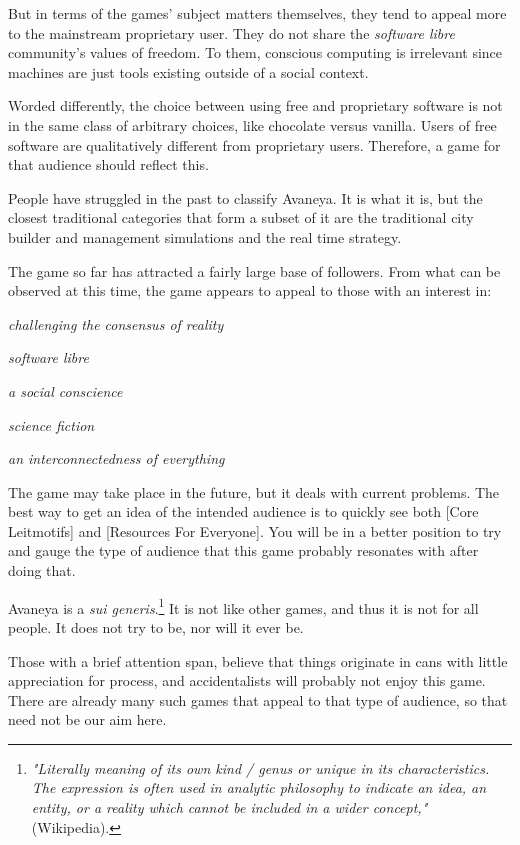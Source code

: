 But in terms of the games' subject matters themselves, they tend to appeal more to the mainstream proprietary user. They do not share the {\it software libre} community's values of freedom. To them, conscious computing is irrelevant since machines are just tools existing outside of a social context. 

Worded differently, the choice between using free and proprietary software is not in the same class of arbitrary choices, like chocolate versus vanilla. Users of free software are qualitatively different from proprietary users. Therefore, a game for that audience should reflect this.

People have struggled in the past to classify Avaneya. It is what it is, but the closest traditional categories that form a subset of it are the traditional city builder and management simulations and the real time strategy.

The game so far has attracted a fairly large base of followers. From what can be observed at this time, the game appears to appeal to those with an interest in:

\startitemize[3]
\item
{\it challenging the consensus of reality}
\item
{\it software libre}
\item
{\it a social conscience}
\item
{\it science fiction}
\item
{\it an interconnectedness of everything}
\stopitemize

The game may take place in the future, but it deals with current problems. The best way to get an idea of the intended audience is to quickly see both [Core Leitmotifs] and [Resources For Everyone]. You will be in a better position to try and gauge the type of audience that this game probably resonates with after doing that. 

Avaneya is a {\it sui generis}.\footnote{{\it "Literally meaning of its own kind / genus or unique in its characteristics. The expression is often used in analytic philosophy to indicate an idea, an entity, or a reality which cannot be included in a wider concept,"} (Wikipedia).} It is not like other games, and thus it is not for all people. It does not try to be, nor will it ever be.

Those with a brief attention span, believe that things originate in cans with little appreciation for process, and accidentalists will probably not enjoy this game. There are already many such games that appeal to that type of audience, so that need not be our aim here.

